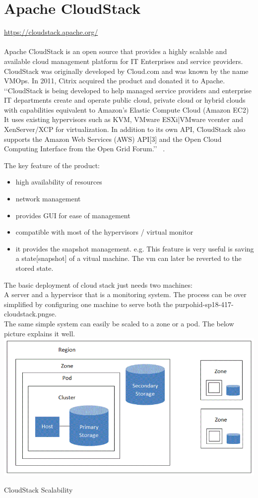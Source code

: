 \graphicspath{ {images/} }
\section{Apache CloudStack}
\url{ https://cloudstack.apache.org/} \\
\\
Apache CloudStack is an open source that provides a highly scalable and available 
cloud management platform for IT
Enterprises and service providers. CloudStack was originally developed by Cloud.com and was known by the name VMOps. 
In 2011, Citrix acquired the product and donated it to Apache. \\
‘‘CloudStack is being developed to help managed service providers and enterprise IT 
departments create and operate public cloud, private cloud or hybrid clouds
with capabilities equivalent to Amazon's Elastic Compute Cloud (Amazon EC2)
It uses existing hypervisors such as KVM, VMware ESXi|VMware vcenter and
XenServer/XCP for virtualization. In addition to its own API, CloudStack 
also supports the Amazon Web Services (AWS) API[3] and the Open Cloud Computing Interface from the Open Grid Forum.’’  
~\cite{ hid-sp18-417-wiki-cloudStack}. 


The key feature of the product:
\begin{itemize}
\item        high availability of resources
\item        network management
\item        provides GUI for ease of management
\item        compatible with most of the hypervisors / virtual monitor
\item        it provides the snapshot management. e.g. This feature is 
very useful is saving a state[snapshot] of a vitual machine. 
The vm can later be reverted to the stored state.  
\end{itemize}
 The basic deployment of cloud stack just needs two machines: \\
 A server and a hypervisor that is a monitoring system. 
 The process can be over simplified by configuring one machine 
 to serve both the purpohid-sp18-417-cloudstack.pngse. \\
 The same simple system can easily be scaled to a zone or a pod.
 The below picture explains it well.
 \includegraphics[width=\textwidth]{ hid-sp18-417-cloudstack}
\begin{center}
CloudStack Scalability ~\cite{hid-sp18-417-cloudstack-scaling} 
\end{center}

